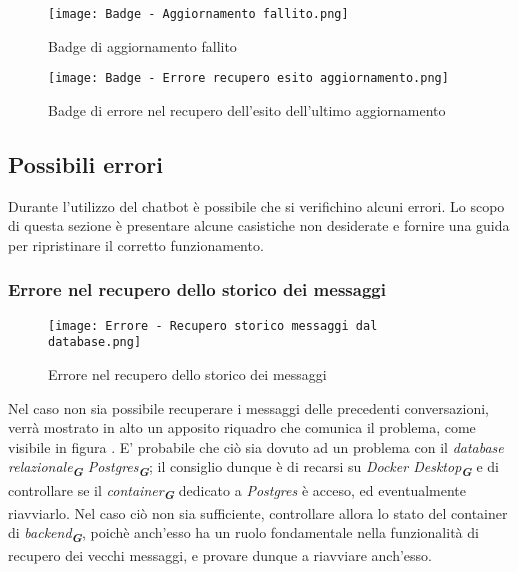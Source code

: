 \begin{figure}[h]
    \centering
        \texttt{[image: Badge - Aggiornamento fallito.png]}
        \caption{Badge di aggiornamento fallito}
        \label{fig:Aggiornamento fallito}
\end{figure}

\begin{figure}[h]
    \centering
        \texttt{[image: Badge - Errore recupero esito aggiornamento.png]}
        \caption{Badge di errore nel recupero dell'esito dell'ultimo aggiornamento}
        \label{fig:Errore nel recupero dell'esito dell'ultimo aggiornamento}
\end{figure}



\newpage

\subsection{Possibili errori}
\label{subsec:possibili_errori}

Durante l'utilizzo del chatbot è possibile che si verifichino alcuni errori. Lo scopo di questa sezione è presentare alcune casistiche non desiderate e fornire una guida per ripristinare il corretto funzionamento.


\subsubsection{Errore nel recupero dello storico dei messaggi}

\begin{figure}[h]
    \centering
        \texttt{[image: Errore - Recupero storico messaggi dal database.png]}
        \caption{Errore nel recupero dello storico dei messaggi}
        \label{fig:Errore nel recupero dello storico dei messaggi}
\end{figure}

Nel caso non sia possibile recuperare i messaggi delle precedenti conversazioni, verrà mostrato in alto un apposito riquadro che comunica il problema, come visibile in figura . E' probabile che ciò sia dovuto ad un problema con il \emph{database relazionale}\textsubscript{\textbf{\textit{G}}} \emph{Postgres}\textsubscript{\textbf{\textit{G}}}; il consiglio dunque è di recarsi su \emph{Docker Desktop}\textsubscript{\textbf{\textit{G}}} e di controllare se il \emph{container}\textsubscript{\textbf{\textit{G}}} dedicato a \emph{Postgres} è acceso, ed eventualmente riavviarlo. Nel caso ciò non sia sufficiente, controllare allora lo stato del container di \emph{backend}\textsubscript{\textbf{\textit{G}}}, poichè anch'esso ha un ruolo fondamentale nella funzionalità di recupero dei vecchi messaggi, e provare dunque a riavviare anch'esso.


